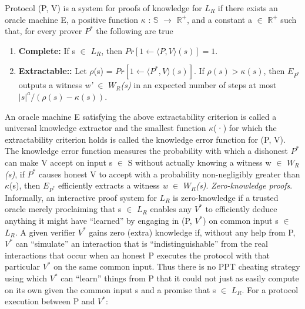 \documentclass[a4paper]{article}
\newcommand{\quotes}[1]{``#1''}
\begin{document}
\newline
Protocol (P, V) is a system for proofs of knowledge for \textit{$L_R$} if there exists an oracle machine E, a positive function \(\kappa\) : $\mathbb{S}$ \(\to\) $\mathbb{R}^{+}$, and a constant a $\in$ $\mathbb{R}^{+}$ such that, for every prover \textit{$P^{*}$} the following are true
\begin{enumerate}
  \item \textbf{Complete:}  If s $\in$ \textit{$L_R$}, then $Pr[1 \gets \langle P, V \rangle (s)] = 1$.
  \item \textbf{Extractable::}  Let \(\rho\)(s) = $Pr[1 \gets \langle P^{*}, V \rangle (s)]$. If $\rho(s) > \kappa(s)$, then $E_{P^{*}}$ outputs a witness \textit{w'} $\in$ \textit{$W_R$(s)} in an expected number of steps at most $ |s|^{a} / (\rho(s) - \kappa(s)) $.
\end{enumerate}
An oracle machine E satisfying the above extractability criterion is called a universal knowledge extractor and the smallest function \(\kappa\)(·) for which the extractability criterion holds  is called the knowledge error function for (P, V). The knowledge error function measures the probability with which a dishonest \textit{$P^{*}$} can make V accept on input s $\in$ S without actually knowing a witness w $\in$ \textit{$W_R$(s)}, if \textit{$P^{*}$} causes honest V to accept with a probability non-negligibly greater than \(\kappa\)(s), then $E_{P^{*}}$ efficiently extracts a witness \textit{w} $\in$ \textit{$W_R$(s)}.
\newline
\textit{Zero-knowledge proofs}. Informally, an interactive proof system for \textit{$L_R$} is zero-knowledge if a trusted oracle merely proclaiming that s $\in$ \textit{$L_R$} enables any \textit{$V^{*}$} to efficiently deduce anything it might have \quotes{learned} by engaging in (P, ${V^{*}}$) on common input s $\in$ \textit{$L_R$}. A given verifier ${V^{*}}$ gains zero (extra) knowledge if, without any help from P, ${V^{*}}$ can \quotes{simulate} an interaction that is \quotes{indistinguishable} from the real interactions that occur when an honest P executes the protocol with that particular ${V^{*}}$ on the same common input. Thus there is no PPT cheating strategy using which ${V^{*}}$ can \quotes{learn} things from P that it could not just as easily compute on its own given the common input s and a promise that s $\in$ \textit{$L_R$}.
\newline
For a protocol execution between P and ${V^{*}}$: 
\end{document}

